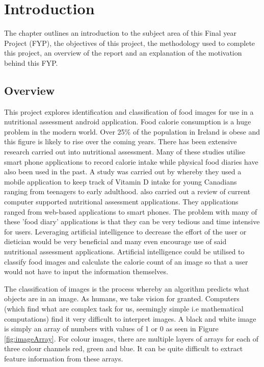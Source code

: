 \chapter{Introduction}
\label{intro}
The chapter outlines an introduction to the subject area of this Final year Project (FYP), the objectives of this project, the methodology used to complete this project, an overview of the report and an explanation of the motivation behind this FYP.

\section{Overview}
This project explores identification and classification of food images for use in a nutritional assessment android application.
Food calorie consumption is a huge problem in the modern world.
Over 25\% of the population in Ireland is obese and this figure is likely to rise over the coming years.
There has been extensive research carried out into nutritional assessment.
Many of these studies utilise smart phone applications to record calorie intake while physical food diaries have also been used in the past.
A study was carried out by \parencite{goodman2015vitamin} whereby they used a mobile application to keep track of Vitamin D intake for young Canadians ranging from teenagers to early adulthood.
\parencite{arens2015promising} also carried out a review of current computer supported nutritional assessment applications. They applications ranged from web-based applications to smart phones.
The problem with many of these 'food diary' applications is that they can be very tedious and time intensive for users.
Leveraging artificial intelligence to decrease the effort of the user or dietician would be very beneficial and many even encourage use of said nutritional assessment applications.
Artificial intelligence could be utilised to classify food images and calculate the calorie count of an image so that a user would not have to input the information themselves.

The classification of images is the process whereby an algorithm predicts what objects are in an image.
As humans, we take vision for granted.
Computers (which find what are complex task for us, seemingly simple i.e mathematical computations) find it very difficult to interpret images.
A black and white image is simply an array of numbers with values of 1 or 0 as seen in Figure \ref{fig:imageArray}. 
For colour images, there are multiple layers of arrays for each of three colour channels red, green and blue.
It can be quite difficult to extract feature information from these arrays.

